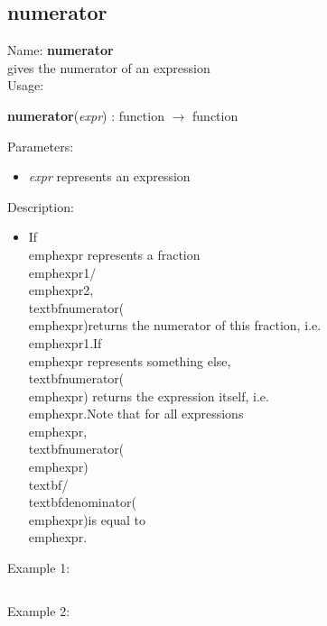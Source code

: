 \subsection{numerator}
\label{labnumerator}
\noindent Name: \textbf{numerator}\\
gives the numerator of an expression\\
\noindent Usage: 
\begin{center}
\textbf{numerator}(\emph{expr}) : \textsf{function} $\rightarrow$ \textsf{function}\\
\end{center}
Parameters: 
\begin{itemize}
\item \emph{expr} represents an expression
\end{itemize}
\noindent Description: \begin{itemize}

\item If \\emph{expr} represents a fraction \\emph{expr1}/\\emph{expr2}, \\textbf{numerator}(\\emph{expr})\n   returns the numerator of this fraction, i.e. \\emph{expr1}.\n    \n   If \\emph{expr} represents something else, \\textbf{numerator}(\\emph{expr}) \n   returns the expression itself, i.e. \\emph{expr}.\n    \n   Note that for all expressions \\emph{expr}, \\textbf{numerator}(\\emph{expr}) \\textbf{/} \\textbf{denominator}(\\emph{expr})\n   is equal to \\emph{expr}.\n\end{itemize}
\noindent Example 1: 
\begin{center}\begin{minipage}{15cm}\begin{Verbatim}[frame=single]
\end{Verbatim}
\end{minipage}\end{center}
\noindent Example 2: 
\begin{center}\begin{minipage}{15cm}\begin{Verbatim}[frame=single]
\end{Verbatim}
\end{minipage}\end{center}
